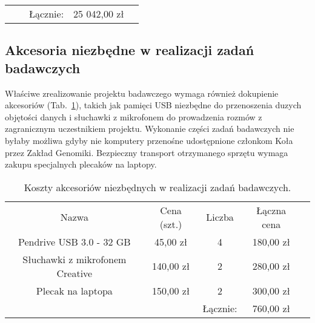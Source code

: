\documentclass{article}
\begin{document}
\begin{table}[]
\begin{tabular}{ccccl}
                          &                                  & Łącznie:          
          & 25 042,00 zł                       & \multicolumn{1}{c}{}
\end{tabular}
\end{table}

\subsection{Akcesoria niezbędne w realizacji zadań badawczych}

Właściwe zrealizowanie projektu badawczego wymaga również dokupienie 
akcesoriów (Tab.~\ref{tab:akcesoria}), takich jak pamięci USB niezbędne do 
przenoszenia duzych objętości danych i słuchawki z mikrofonem do prowadzenia 
rozmów z zagranicznym uczestnikiem projektu. Wykonanie części zadań badawczych 
nie byłaby możliwa gdyby nie komputery przenośne udostępnione członkom Koła 
przez Zakład Genomiki. Bezpieczny transport otrzymanego sprzętu wymaga zakupu 
specjalnych plecaków na laptopy.

\begin{table}[]
\centering
\caption{Koszty akcesoriów niezbędnych w realizacji zadań badawczych.}
\label{tab:akcesoria}
\begin{tabular}{ccccc}
\cline{1-4}
\multicolumn{1}{|c|}{Nazwa}                           & \multicolumn{1}{c|}{Cena 
(szt.)} & \multicolumn{1}{c|}{Liczba} & \multicolumn{1}{c|}{Łączna cena} &       
               \\ \cline{1-4}
\multicolumn{1}{|c|}{Pendrive USB 3.0 - 32 GB}        & 
\multicolumn{1}{c|}{45,00 zł}    & \multicolumn{1}{c|}{4}      & 
\multicolumn{1}{c|}{180,00 zł}   &                      \\ \cline{1-4}
\multicolumn{1}{|c|}{Słuchawki z mikrofonem Creative} & 
\multicolumn{1}{c|}{140,00 zł}   & \multicolumn{1}{c|}{2}      & 
\multicolumn{1}{c|}{280,00 zł}   &                      \\ \cline{1-4}
\multicolumn{1}{|c|}{Plecak na laptopa}               & 
\multicolumn{1}{c|}{150,00 zł}   & \multicolumn{1}{c|}{2}      & 
\multicolumn{1}{c|}{300,00 zł}   & \multicolumn{1}{l}{} \\ \cline{1-4}
                                                      &                          
        & Łącznie:                    & 760,00 zł                        &       
              
\end{tabular}
\end{table}
\end{document}
